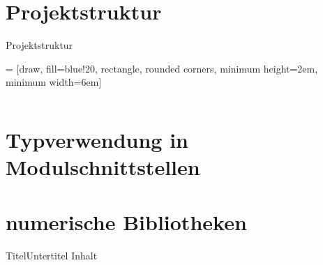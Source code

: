 \documentclass{beamer}
\begin{document}
\section{Projektstruktur}

\begin{frame}{Projektstruktur}{}

 = [draw, fill=blue!20, rectangle, rounded corners, 
    minimum height=2em, minimum width=6em]
\begin{columns}





\end{columns}

\end{frame}

\section{Typverwendung in Modulschnittstellen}

\section{numerische Bibliotheken}

\begin{frame}{Titel}{Untertitel}
    Inhalt
\end{frame}
\end{document}
